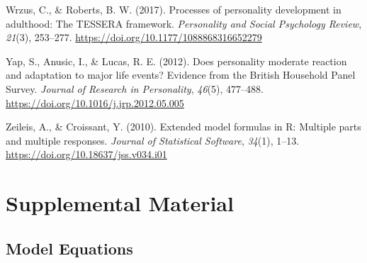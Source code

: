 \documentclass[
  english,
  man,floatsintext]{apa7}
\begin{document}
\leavevmode\hypertarget{ref-wrzusProcessesPersonalityDevelopment2017}{}%
Wrzus, C., \& Roberts, B. W. (2017). Processes of personality development in adulthood: The TESSERA framework. \emph{Personality and Social Psychology Review}, \emph{21}(3), 253--277. \url{https://doi.org/10.1177/1088868316652279}

\leavevmode\hypertarget{ref-yapDoesPersonalityModerate2012}{}%
Yap, S., Anusic, I., \& Lucas, R. E. (2012). Does personality moderate reaction and adaptation to major life events? Evidence from the British Household Panel Survey. \emph{Journal of Research in Personality}, \emph{46}(5), 477--488. \url{https://doi.org/10.1016/j.jrp.2012.05.005}

\leavevmode\hypertarget{ref-R-Formula}{}%
Zeileis, A., \& Croissant, Y. (2010). Extended model formulas in R: Multiple parts and multiple responses. \emph{Journal of Statistical Software}, \emph{34}(1), 1--13. \url{https://doi.org/10.18637/jss.v034.i01}

\endgroup

\newpage

\hypertarget{appendix-appendix}{%
\appendix}


\renewcommand{\appendixname}{\textcolor{white}{.}}

\hypertarget{supplemental-material}{%
\section{Supplemental Material}\label{supplemental-material}}

\renewcommand{\thefigure}{S\arabic{figure}} \setcounter{figure}{0}
\renewcommand{\thetable}{S\arabic{table}} \setcounter{table}{0}

\setcounter{page}{1}

\hypertarget{model-equations}{%
\subsection{Model Equations}\label{model-equations}}
\end{document}
